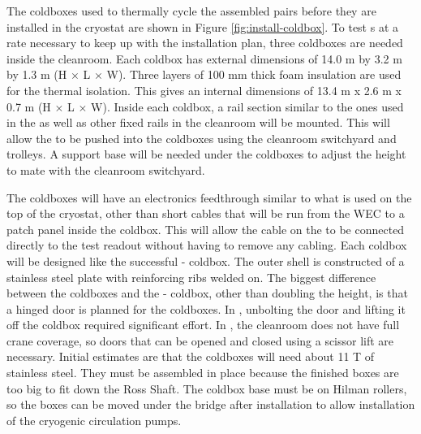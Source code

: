 The coldboxes used to thermally cycle the assembled  pairs before they are installed in the cryostat are shown in Figure \ref{fig:install-coldbox}. 
To test s at a rate necessary to keep up with the installation plan, three coldboxes are needed inside the cleanroom. 
Each coldbox has external dimensions of 14.0 \si{m} by 3.2 \si{m} by 1.3 \si{m} (H $\times$ L $\times$ W). 
Three layers of 100 \si{mm} thick foam insulation are used for the thermal isolation. 
This gives an internal dimensions of 13.4 \si{m} x 2.6 \si{m} x 0.7 \si{m} (H $\times$ L $\times$ W). 
Inside each coldbox, a rail section similar to the ones used in the  as well as other fixed rails in the cleanroom will be mounted.
This will allow the  to be pushed into the coldboxes using the cleanroom switchyard and trolleys. 
A support base will be needed under the coldboxes to adjust the height to mate with the cleanroom switchyard.

The coldboxes will have an electronics feedthrough similar to what is used on the top of the  cryostat, other than short cables that will be run from the WEC  to a patch panel inside the coldbox.
This will allow the cable on the  to be connected directly to the test readout without having to remove any cabling. 
Each coldbox will be designed like the successful - coldbox. 
The outer shell is constructed of a stainless steel plate with reinforcing ribs welded on. 
The biggest difference between the 
 coldboxes and the - coldbox, other than doubling the height, is that a hinged door is planned for the  coldboxes. 
In , unbolting the door and lifting it off the coldbox required significant effort. 
In , the cleanroom does not have full crane coverage, so doors that can be opened and closed using a scissor lift are necessary.
Initial estimates are that the  coldboxes will need about 11 \si{T} of stainless steel. 
They must be assembled in place because the finished boxes are too big to fit down the Ross Shaft. 
The coldbox base must be on Hilman rollers, so the boxes can be moved under the bridge after installation to allow installation of the cryogenic circulation pumps.
 





